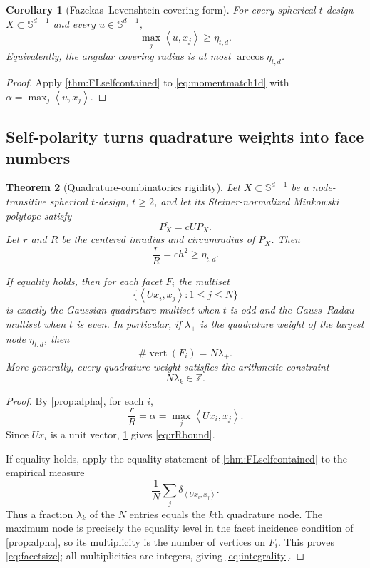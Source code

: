 \documentclass[11pt]{amsart}
\newtheorem{theorem}{Theorem}[section]
\newtheorem{corollary}[theorem]{Corollary}
\theoremstyle{definition}
\theoremstyle{remark}
\newcommand{\Sph}{\mathbb S}
\newcommand{\Verts}{\operatorname{vert}}
\newcommand{\ip}[2]{\left\langle #1,#2\right\rangle}
\begin{document}
\begin{corollary}[Fazekas--Levenshtein covering form]\label{cor:covering}
For every spherical $t$-design $X\subset\Sph^{d-1}$ and every $u\in\Sph^{d-1}$,
\begin{equation}\label{eq:covering}
 \max_j\ip{u}{x_j}\ge\eta_{t,d}.
\end{equation}
Equivalently, the angular covering radius is at most $\arccos\eta_{t,d}$.
\end{corollary}

\begin{proof}
Apply \cref{thm:FLselfcontained} to \eqref{eq:momentmatch1d} with $\alpha=\max_j\ip{u}{x_j}$.  \qedhere
\end{proof}

\subsection{Self-polarity turns quadrature weights into face numbers}

\begin{theorem}[Quadrature-combinatorics rigidity]\label{thm:quadcomb}
Let $X\subset\Sph^{d-1}$ be a node-transitive spherical $t$-design, $t\ge2$, and let its Steiner-normalized Minkowski polytope satisfy
\[
 P_X^\circ=cUP_X.
\]
Let $r$ and $R$ be the centered inradius and circumradius of $P_X$.  Then
\begin{equation}\label{eq:rRbound}
 \boxed{\frac rR=ch^2\ge\eta_{t,d}.}
\end{equation}

If equality holds, then for each facet $F_i$ the multiset
\begin{equation}\label{eq:rowmultiset}
 \{\ip{Ux_i}{x_j}:1\le j\le N\}
\end{equation}
is exactly the Gaussian quadrature multiset when $t$ is odd and the Gauss--Radau multiset when $t$ is even.  In particular, if $\lambda_+$ is the quadrature weight of the largest node $\eta_{t,d}$, then
\begin{equation}\label{eq:facetsize}
 \boxed{\#\Verts(F_i)=N\lambda_+.}
\end{equation}
More generally, every quadrature weight satisfies the arithmetic constraint
\begin{equation}\label{eq:integrality}
 N\lambda_k\in\mathbb Z.
\end{equation}
\end{theorem}

\begin{proof}
By \cref{prop:alpha}, for each $i$,
\[
 \frac rR=\alpha=\max_j\ip{Ux_i}{x_j}.
\]
Since $Ux_i$ is a unit vector, \cref{cor:covering} gives \eqref{eq:rRbound}.

If equality holds, apply the equality statement of \cref{thm:FLselfcontained} to the empirical measure
\[
 \frac1N\sum_j\delta_{\ip{Ux_i}{x_j}}.
\]
Thus a fraction $\lambda_k$ of the $N$ entries equals the $k$th quadrature node.  The maximum node is precisely the equality level in the facet incidence condition of \cref{prop:alpha}, so its multiplicity is the number of vertices on $F_i$.  This proves \eqref{eq:facetsize}; all multiplicities are integers, giving \eqref{eq:integrality}.  \qedhere
\end{proof}
\end{document}
